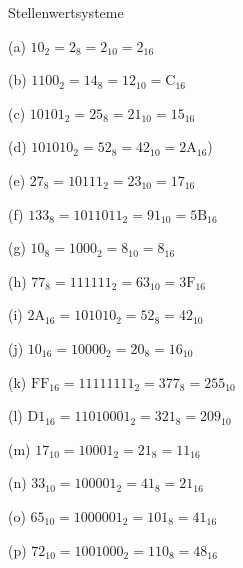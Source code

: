 \begin{exercise}{Stellenwertsysteme}
\begin{solution}
\begin{center}
\begin{minipage}{0.45\textwidth}
\begin{parts}
\item[(a)] $10_2 = 2_8 = 2_{10} = 2_{16}$
\item[(b)] $1100_2 = 14_8 = 12_{10} = \mathrm{C}_{16}$
\item[(c)] $10101_2 = 25_8 = 21_{10} = 15_{16}$
\item[(d)] $101010_2 = 52_8 = 42_{10} = \mathrm{2A}_{16}$)
\item[(e)] $27_8 = 10111_2 = 23_{10} = 17_{16}$
\item[(f)] $133_8 = 1011011_2 = 91_{10} = \mathrm{5B}_{16}$
\item[(g)] $10_8 = 1000_2 = 8_{10} = 8_{16}$
\item[(h)] $77_8 = 111111_2 = 63_{10} = \mathrm{3F}_{16}$
\end{parts}
\end{minipage}
\begin{minipage}{0.45\textwidth}
\begin{parts}
\item[(i)] $\mathrm{2A}_{16} = 101010_2 = 52_8 = 42_{10}$  
\item[(j)] $10_{16} = 10000_2 = 20_8 = 16_{10}$           
\item[(k)] $\mathrm{FF}_{16} = 11111111_2 = 377_8 = 255_{10}$ 
\item[(l)] $\mathrm{D1}_{16} = 11010001_2 = 321_8 = 209_{10}$ 
\item[(m)] $17_{10} = 10001_2 = 21_8 = 11_{16}$  
\item[(n)] $33_{10} = 100001_2 = 41_8 = 21_{16}$           
\item[(o)] $65_{10} = 1000001_2 = 101_8 = 41_{16}$ 
\item[(p)] $72_{10} = 1001000_2 = 110_8 = 48_{16}$ 
\end{parts}
\end{minipage}
\end{center}
\end{solution}
\end{exercise}
